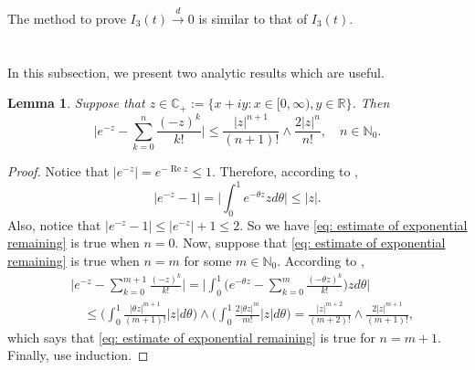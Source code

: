 \documentclass[12pt,oneside,english]{amsart}
\theoremstyle{plain}
\newtheorem{lem}[thm]{Lemma}
\theoremstyle{definition}
\numberwithin{equation}{section}
\begin{document}
The method to prove $I_3(t)\xrightarrow{d}0$ is similar to that of $I_3(t)$.

\appendix
\section{}

\subsection{}
    In this subsection, we present two analytic results which are useful.
\begin{lem}
\label{lem: estimate of exponential remaining}
    Suppose that $z\in \mathbb C_+:= \{x+iy: x \in [0,\infty), y \in \mathbb R\}$. Then
\begin{equation}
\label{eq: estimate of exponential remaining}
    \Big|e^{-z} - \sum_{k=0}^n \frac{(-z)^k}{k!} \Big|
    \leq \frac{|z|^{n+1}}{(n+1)!} \wedge \frac{2|z|^{n}}{n!}, \quad n\in \mathbb N_0.
\end{equation}
\end{lem}
\begin{proof}
    Notice that $|e^{-z}| = e^{- \operatorname{Re} z} \leq 1$.
    Therefore, according to \cite[Theorem 7.20.]{Rudin1987Real},
\begin{equation}
    |e^{-z} - 1| = \Big| \int_0^1 e^{-\theta z} z d\theta\Big|
    \leq |z|.
\end{equation}
    Also, notice that $|e^{-z} - 1| \leq |e^{-z}|+1 \leq 2$.
    So we have \eqref{eq: estimate of exponential remaining} is true when $n = 0$.
    Now, suppose that \eqref{eq: estimate of exponential remaining} is true when $n = m$ for some $m \in \mathbb N_0$.
    According to \cite[Theorem 7.20.]{Rudin1987Real},
\begin{align}
    &\Big|e^{-z} - \sum_{k=0}^{m+1} \frac{(-z)^k}{k!}\Big|
    = \Big| \int_0^1\Big(e^{-\theta z} - \sum_{k=0}^m \frac{(-\theta z)^k}{k!} \Big) z d\theta \Big|
    \\&\quad \leq  \Big(\int_0^1 \frac{|\theta z|^{m+1}}{(m+1)!} |z| d\theta\Big) \wedge \Big(\int_0^1 \frac{2|\theta z|^{m}}{m!} |z| d\theta\Big)
    = \frac{|z|^{m+2}}{(m+2)!} \wedge \frac{2|z|^{m+1}}{(m+1)!},
\end{align}
    which says that \eqref{eq: estimate of exponential remaining} is true for $n = m + 1$.
    Finally, use induction.
\end{proof}
\end{document}
